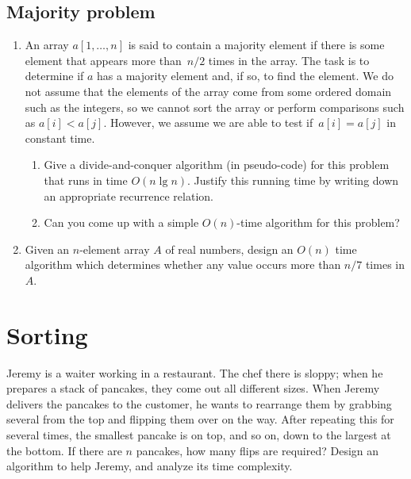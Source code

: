 \begin{refsection}
\subsection{Majority problem}
\begin{Exercise}
\begin{enumerate}
\item An array $a[1, \dots, n]$ is said to contain a majority element if there is some element that appears more than~$n/2$ times in the array. The task is to determine if $a$ has a majority element and, if so, to find the element. We do not assume that the elements of the array come from some ordered domain such as the integers, so we cannot sort the array or perform comparisons such as $a[i] < a[j]$. However, we assume we are able to test if~$a[i] = a[j]$ in constant time.
\begin{enumerate}
\item Give a divide-and-conquer algorithm (in pseudo-code) for this problem that runs in time $O(n \lg n)$. Justify this running time by writing down an appropriate recurrence relation.
\item Can you come up with a simple $O(n)$-time algorithm for this problem? 
\end{enumerate}
\item Given an $n$-element array $A$ of real numbers, design an $O(n)$ time algorithm which determines whether any value occurs more than $n/7$ times in $A$. 
\end{enumerate}
\end{Exercise}
\begin{Answer}
\end{Answer}

\section{Sorting}

\begin{Exercise}
Jeremy is a waiter working in a restaurant. The chef there is sloppy; when he prepares a stack of pancakes, they come out all different sizes. When Jeremy delivers the pancakes to the customer, he wants to rearrange them by grabbing several from the top and flipping them over on the way. After repeating this for several times, the smallest pancake is on top, and so on, down to the largest at the bottom. If there are $n$ pancakes, how many flips are required? Design an algorithm to help Jeremy, and analyze its time complexity.  
\end{Exercise}
\begin{Answer}
\end{Answer}


\end{refsection}
